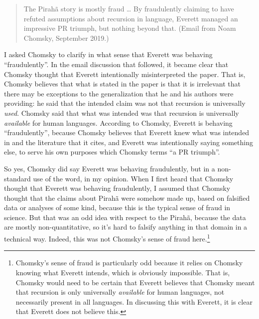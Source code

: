 \documentclass{article}
\begin{document}
\begin{quote}
    The Pirahã story is mostly fraud \ldots{}  By fraudulently claiming to have refuted assumptions about recursion in language, Everett managed an impressive PR triumph, but nothing beyond that. (Email from Noam Chomsky, September 2019.)
\end{quote}

I asked Chomsky to clarify in what sense that Everett was behaving ``fraudulently''. In the email discussion that followed, it became clear that Chomsky thought that Everett intentionally misinterpreted the \citet{hauser2002faculty} paper.  That is, Chomsky believes that what is stated in the \citet{hauser2002faculty} paper is that it is irrelevant that there may be exceptions to the generalization that he and his authors were providing: he said that the intended claim was not that recursion is universally \textit{used}. Chomsky said that what was intended was that recursion is universally \textit{available} for human languages. According to Chomsky, Everett is behaving ``fraudulently'', because Chomsky believes that Everett knew what was intended in \citet{hauser2002faculty} and the literature that it cites, and Everett was intentionally saying something else, to serve his own purposes which Chomsky terms ``a PR triumph''. 

\begin{sloppypar}
So yes, Chomsky did say Everett was behaving fraudulently, but in a non-standard use of the word, in my opinion. When I first heard that Chomsky thought that Everett was behaving fraudulently, I assumed that Chomsky thought that the claims about Pirahã were somehow made up, based on falsified data or analyses of some kind, because this is the typical sense of fraud in science.  But that was an odd idea with respect to the Pirahã, because the data are mostly non-quantitative, so it's hard to falsify anything in that domain in a technical way. Indeed, this was not Chomsky's sense of fraud here.\footnote{Chomsky's sense of fraud is particularly odd because it relies on Chomsky knowing what Everett intends, which is obviously impossible. That is, Chomsky would need to be certain that Everett believes that Chomsky meant that recursion is only universally \textit{available} for human languages, not necessarily present in all languages. In discussing this with Everett, it is clear that Everett does not believe this.}
\end{sloppypar}
\end{document}

